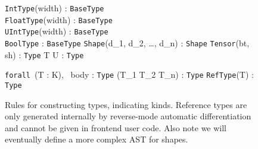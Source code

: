 \begin{figure*}
  \begin{minipage}{.5\textwidth}%
       {\Delta \vdash \texttt{IntType}(width) : \texttt{BaseType} \\ \Delta \vdash \texttt{FloatType}(width) : \texttt{BaseType} \\ \Delta \vdash \texttt{UIntType}(width) : \texttt{BaseType} \\ \Delta \vdash \texttt{BoolType} : \texttt{BaseType}}
      {\Delta \vdash \texttt{Shape}(d_1, d_2, \ldots, d_n) : \texttt{Shape} }
      {\Delta \vdash \texttt{Tensor}(bt, sh) : \texttt{Type} }
      {\Delta \vdash T \rightarrow U : \texttt{Type} }
  \end{minipage}%
  \begin{minipage}{.5\textwidth}%
      {\Delta \vdash \texttt{forall}\ (T : K), \, body : \texttt{Type}}
      {\Delta \vdash (T_1 \times T_2 \times \cdots \times T_n) : \texttt{Type} }
      {\Delta \vdash \texttt{RefType}(T) : \texttt{Type}}
  \end{minipage}%
\caption{Rules for constructing types, indicating kinds. Reference types are only generated internally by reverse-mode automatic differentiation and cannot be given in frontend user code. Also note we will eventually define a more complex AST for shapes.}
\end{figure*}

